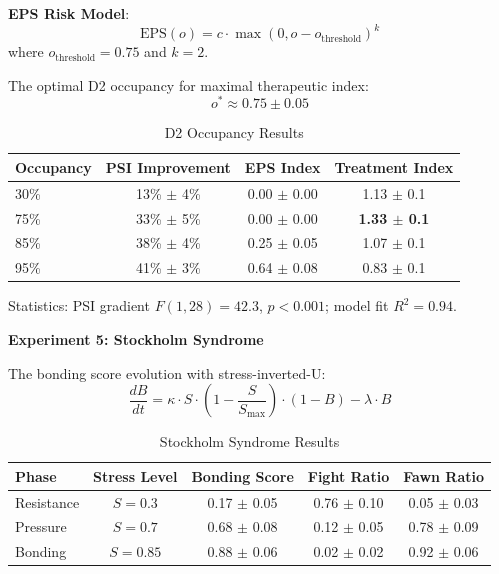 \documentclass[preprint,12pt]{elsarticle}
\begin{document}
\textbf{EPS Risk Model}:
\begin{equation}
\text{EPS}(o) = c \cdot \max(0, o - o_{\text{threshold}})^k
\end{equation}
where $o_{\text{threshold}} = 0.75$ and $k = 2$.

\begin{lemma}
The optimal D2 occupancy for maximal therapeutic index:
\begin{equation}
o^* \approx 0.75 \pm 0.05
\end{equation}
\end{lemma}

\begin{table}[htbp]
\centering
\caption{D2 Occupancy Results}
\label{tab:d2}
\begin{tabular}{lccc}
\toprule
\textbf{Occupancy} & \textbf{PSI Improvement} & \textbf{EPS Index} & \textbf{Treatment Index} \\
\midrule
30\% & 13\% $\pm$ 4\% & 0.00 $\pm$ 0.00 & 1.13 $\pm$ 0.1 \\
75\% & 33\% $\pm$ 5\% & 0.00 $\pm$ 0.00 & \textbf{1.33 $\pm$ 0.1} \\
85\% & 38\% $\pm$ 4\% & 0.25 $\pm$ 0.05 & 1.07 $\pm$ 0.1 \\
95\% & 41\% $\pm$ 3\% & 0.64 $\pm$ 0.08 & 0.83 $\pm$ 0.1 \\
\bottomrule
\end{tabular}
\end{table}

Statistics: PSI gradient $F(1,28)=42.3$, $p<0.001$; model fit $R^2 = 0.94$.

\textbf{Experiment 5: Stockholm Syndrome}

\begin{definition}
The bonding score evolution with stress-inverted-U:
\begin{equation}
\frac{dB}{dt} = \kappa \cdot S \cdot \left(1 - \frac{S}{S_{\max}}\right) \cdot (1 - B) - \lambda \cdot B
\end{equation}
\end{definition}

\begin{table}[htbp]
\centering
\caption{Stockholm Syndrome Results}
\label{tab:stockholm}
\begin{tabular}{lcccc}
\toprule
\textbf{Phase} & \textbf{Stress Level} & \textbf{Bonding Score} & \textbf{Fight Ratio} & \textbf{Fawn Ratio} \\
\midrule
Resistance & $S=0.3$ & 0.17 $\pm$ 0.05 & 0.76 $\pm$ 0.10 & 0.05 $\pm$ 0.03 \\
Pressure & $S=0.7$ & 0.68 $\pm$ 0.08 & 0.12 $\pm$ 0.05 & 0.78 $\pm$ 0.09 \\
Bonding & $S=0.85$ & 0.88 $\pm$ 0.06 & 0.02 $\pm$ 0.02 & 0.92 $\pm$ 0.06 \\
\bottomrule
\end{tabular}
\end{table}
\end{document}
